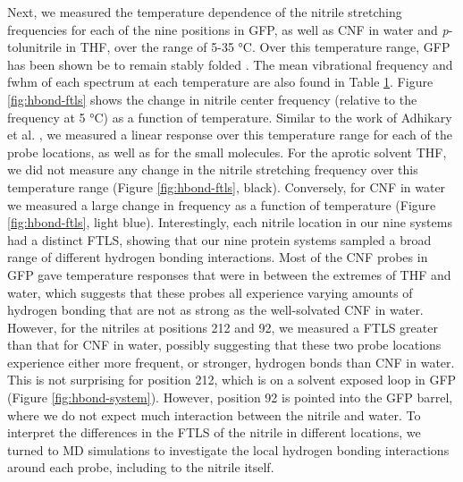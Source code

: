 \begin{table}
\begin{center}
\begin{tabular}{c|cc|cc}
            \bottomrule
            
            \end{tabular}
    \end{center}
    \label{tbl:hbond-IR_summary}
\end{table}

Next, we measured the temperature dependence of the nitrile stretching frequencies for each of the nine positions in GFP, as well as CNF in water and \emph{p}-tolunitrile in THF, over the range of 5-35 \si{\celsius}.
Over this temperature range, GFP has been shown be to remain stably folded \cite{Slocum2016, Pedelacq2006}.
The mean vibrational frequency and fwhm of each spectrum at each temperature are also found in Table \ref{tbl:hbond-IR_summary}.
Figure \ref{fig:hbond-ftls} shows the change in nitrile center frequency (relative to the frequency at 5 \si{\celsius}) as a function of temperature.
Similar to the work of Adhikary et al. \cite{Adhikary2015}, we measured a linear response over this temperature range for each of the probe locations, as well as for the small molecules.
For the aprotic solvent THF, we did not measure any change in the nitrile stretching frequency over this temperature range (Figure \ref{fig:hbond-ftls}, black).
Conversely, for CNF in water we measured a large change in frequency as a function of temperature (Figure \ref{fig:hbond-ftls}, light blue).
Interestingly, each nitrile location in our nine systems had a distinct FTLS, showing that our nine protein systems sampled a broad range of different hydrogen bonding interactions.
Most of the CNF probes in GFP gave temperature responses that were in between the extremes of THF and water, which suggests that these probes all experience varying amounts of hydrogen bonding that are not as strong as the well-solvated CNF in water.
However, for the nitriles at positions 212 and 92, we measured a FTLS greater than that for CNF in water, possibly suggesting that these two probe locations experience either more frequent, or stronger, hydrogen bonds than CNF in water.
This is not surprising for position 212, which is on a solvent exposed loop in GFP (Figure \ref{fig:hbond-system}).
However, position 92 is pointed into the GFP barrel, where we do not expect much interaction between the nitrile and water.
To interpret the differences in the FTLS of the nitrile in different locations, we turned to MD simulations to investigate the local hydrogen bonding interactions around each probe, including to the nitrile itself. 

